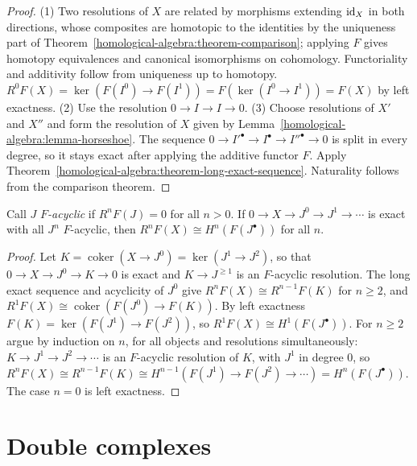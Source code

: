 \begin{proof}
(1) Two resolutions of $X$ are related by morphisms extending $\mathrm{id}_X$ in both directions, whose composites are homotopic
to the identities by the uniqueness part of Theorem~\ref{homological-algebra:theorem-comparison}; applying $F$ gives
homotopy equivalences and canonical isomorphisms on cohomology. Functoriality and additivity follow from uniqueness up
to homotopy. $R^0F(X) = \ker(F(I^0) \to F(I^1)) = F(\ker(I^0 \to I^1)) = F(X)$ by left exactness.
(2) Use the resolution $0 \to I \to I \to 0$.
(3) Choose resolutions of $X'$ and $X''$ and form the resolution of $X$ given by
Lemma~\ref{homological-algebra:lemma-horseshoe}. The sequence $0 \to I'^\bullet \to I^\bullet \to I''^\bullet \to 0$ is split in every
degree, so it stays exact after applying the additive functor $F$. Apply
Theorem~\ref{homological-algebra:theorem-long-exact-sequence}. Naturality follows from the comparison theorem.
\end{proof}

\begin{proposition}\label{homological-algebra:proposition-acyclic-resolutions}
Call $J$ \emph{$F$-acyclic} if $R^nF(J) = 0$ for all $n > 0$. If $0 \to X \to J^0 \to J^1 \to \cdots$ is exact with all $J^n$
$F$-acyclic, then $R^nF(X) \cong H^n(F(J^\bullet))$ for all $n$.
\end{proposition}

\begin{proof}
Let $K = \operatorname{coker}(X \to J^0) = \ker(J^1 \to J^2)$, so that $0 \to X \to J^0 \to K \to 0$ is exact and $K \to J^{\geq 1}$ is an $F$-acyclic
resolution. The long exact sequence and acyclicity of $J^0$ give $R^nF(X) \cong R^{n-1}F(K)$ for $n \geq 2$, and
$R^1F(X) \cong \operatorname{coker}(F(J^0) \to F(K))$. By left exactness $F(K) = \ker(F(J^1) \to F(J^2))$, so
$R^1F(X) \cong H^1(F(J^\bullet))$. For $n \geq 2$ argue by induction on $n$, for all objects and resolutions simultaneously:
$K \to J^1 \to J^2 \to \cdots$ is an $F$-acyclic resolution of $K$, with $J^1$ in degree $0$, so
$R^nF(X) \cong R^{n-1}F(K) \cong H^{n-1}(F(J^1) \to F(J^2) \to \cdots) = H^n(F(J^\bullet))$. The case $n = 0$ is left exactness.
\end{proof}

\section{Double complexes}\label{homological-algebra:section-double-complexes}

